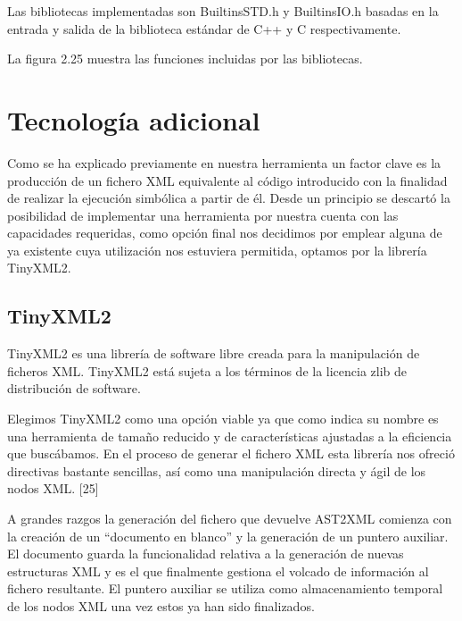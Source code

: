 Las bibliotecas implementadas son BuiltinsSTD.h y BuiltinsIO.h basadas en la entrada y salida de la biblioteca est\'andar de C++ y C respectivamente.

La figura 2.25 muestra las funciones incluidas por las bibliotecas.



\section{Tecnolog\'ia adicional}

Como se ha explicado previamente en nuestra herramienta un factor clave es la producci\'on de un fichero XML equivalente al c\'odigo introducido con la finalidad de realizar la ejecuci\'on simb\'olica a partir de \'el. Desde un principio se descart\'o la posibilidad de implementar una herramienta por nuestra cuenta con las capacidades requeridas, como opci\'on final nos decidimos por emplear alguna de ya existente cuya utilizaci\'on nos estuviera permitida, optamos por la librer\'ia TinyXML2.

\subsection*{TinyXML2}

TinyXML2 es una librer\'ia de software libre creada para la manipulaci\'on de ficheros XML. TinyXML2 est\'a sujeta a los t\'erminos de la licencia zlib de distribuci\'on de software.

Elegimos TinyXML2 como una opci\'on viable ya que como indica su nombre es una herramienta de tama\~no reducido y de caracter\'isticas ajustadas a la eficiencia que busc\'abamos. En el proceso de generar el fichero XML esta librer\'ia nos ofreci\'o directivas bastante sencillas, as\'i como una manipulaci\'on directa y \'agil de los nodos XML. [25]

A grandes razgos la generaci\'on del fichero que devuelve AST2XML comienza con la creaci\'on de un ``documento en blanco'' y la generaci\'on de un puntero auxiliar. El documento guarda la funcionalidad relativa a la generaci\'on de nuevas estructuras XML y es el que finalmente gestiona el volcado de informaci\'on al fichero resultante. El puntero auxiliar se utiliza como almacenamiento temporal de los nodos XML una vez estos ya han sido finalizados.

